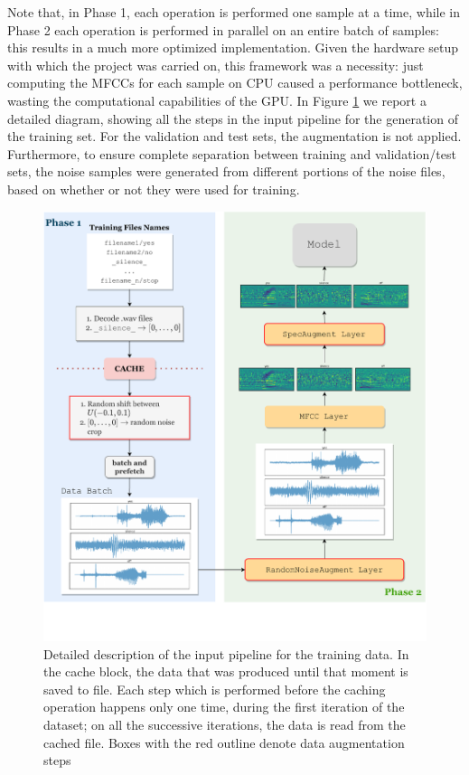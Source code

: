 Note that, in Phase 1, each operation is performed one sample at a time, while in Phase 2 each operation is performed in parallel on an entire batch of samples: this results in a much more optimized implementation. Given the hardware setup with which the project was carried on, this framework was a necessity: just computing the MFCCs for each sample on CPU caused a performance bottleneck, wasting the computational capabilities of the GPU. In Figure \ref{fig:inputpipeline} we report a detailed diagram, showing all the steps in the input pipeline for the generation of the training set. For the validation and test sets, the augmentation is not applied. Furthermore, to ensure complete separation between training and validation/test sets, the noise samples were generated from different portions of the noise files, based on whether or not they were used for training.

\begin{figure}
	\centering
	\includegraphics[width=0.99\linewidth]{imgs/input_pipeline_v3.pdf}
	\caption{Detailed description of the input pipeline for the training data. In the cache block, the data that was produced until that moment is saved to file. Each step which is performed before the caching operation happens only one time, during the first iteration of the dataset; on all the successive iterations, the data is read from the cached file. Boxes with the red outline denote data augmentation steps}
	\label{fig:inputpipeline}
\end{figure}





